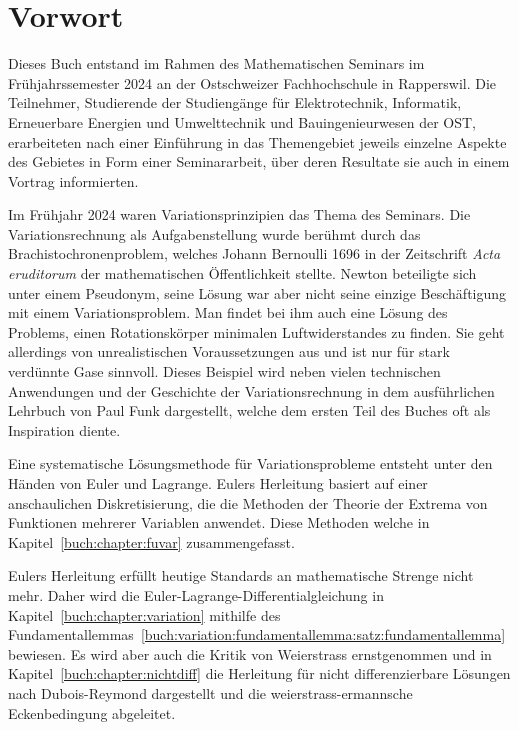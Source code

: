%
%
%
\chapter*{Vorwort}


Dieses Buch entstand im Rahmen des Mathematischen Seminars
im Frühjahrssemester 2024 an der Ostschweizer Fachhochschule in Rapperswil.
Die Teilnehmer, Studierende der Studiengänge für Elektrotechnik, Informatik,
Erneuerbare Energien und Umwelttechnik und Bauingenieurwesen
der OST, erarbeiteten nach einer Einführung in das Themengebiet jeweils
einzelne Aspekte des Gebietes in Form einer Seminararbeit, über
deren Resultate sie auch in einem Vortrag informierten. 

Im Frühjahr 2024 waren Variationsprinzipien das Thema des Seminars.
Die Variationsrechnung als Aufgabenstellung wurde berühmt durch
das Brachistochronenproblem, welches Johann Bernoulli 1696 in der
Zeitschrift {\em Acta eruditorum} der mathematischen Öffentlichkeit
stellte.
Newton beteiligte sich unter einem Pseudonym, seine Lösung war aber nicht
seine einzige Beschäftigung mit einem Variationsproblem.
Man findet bei ihm auch eine Lösung des Problems, einen Rotationskörper
minimalen Luftwiderstandes zu finden.
Sie geht allerdings von unrealistischen Voraussetzungen aus und ist
nur für stark verdünnte Gase sinnvoll.
Dieses Beispiel wird neben vielen technischen Anwendungen und 
der Geschichte der Variationsrechnung in dem ausführlichen Lehrbuch
\cite{buch:funk} von Paul Funk dargestellt, welche dem ersten Teil
des Buches oft als Inspiration diente.

Eine systematische Lösungsmethode für Variationsprobleme entsteht unter
den Händen von Euler und Lagrange.
Eulers Herleitung basiert auf einer anschaulichen Diskretisierung,
die die Methoden der Theorie der Extrema von Funktionen mehrerer
Variablen anwendet.
Diese Methoden welche in Kapitel~\ref{buch:chapter:fuvar}
zusammengefasst.

Eulers Herleitung erfüllt heutige Standards an mathematische
Strenge nicht mehr.
Daher wird die Euler-Lagrange-Differentialgleichung in
Kapitel~\ref{buch:chapter:variation} mithilfe des
Fundamentallemmas~\ref{buch:variation:fundamentallemma:satz:fundamentallemma}
bewiesen.
Es wird aber auch die Kritik von Weierstrass ernstgenommen und
in Kapitel~\ref{buch:chapter:nichtdiff} die
Herleitung für nicht differenzierbare Lösungen nach Dubois-Reymond
dargestellt und die weierstrass-ermannsche Eckenbedingung abgeleitet.

